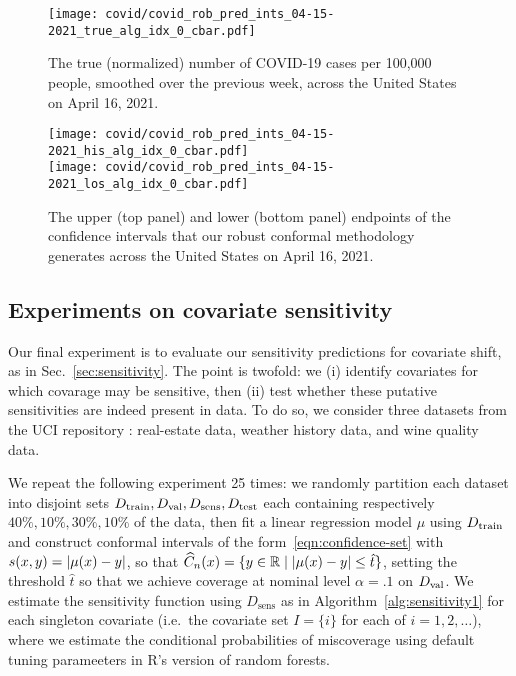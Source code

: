 \begin{figure}[ht!]
  \centering
  \texttt{[image: covid/covid\_rob\_pred\_ints\_04-15-2021\_true\_alg\_idx\_0\_cbar.pdf]}
  \caption{The true (normalized) number of COVID-19 cases per 100{,}000 people, smoothed over the previous week, across the United States on April 16, 2021.}
  \label{fig:covid-true}
\end{figure}

\clearpage
\begin{figure}[h!]
  \centering
  \texttt{[image: covid/covid\_rob\_pred\_ints\_04-15-2021\_his\_alg\_idx\_0\_cbar.pdf]} \\
  \texttt{[image: covid/covid\_rob\_pred\_ints\_04-15-2021\_los\_alg\_idx\_0\_cbar.pdf]}
  \caption{The upper (top panel) and lower (bottom panel) endpoints of the confidence intervals that our robust conformal methodology generates across the United States on April 16, 2021.}
  \label{fig:covid-hi-lo}
\end{figure}
\clearpage

\subsection{Experiments on covariate sensitivity}
\label{sec:covariate-sensitivity}

Our final experiment is to evaluate our sensitivity predictions for
covariate shift, as in Sec.~\ref{sec:sensitivity}. The point is twofold: we
(i) identify covariates for which covarage may be sensitive, then (ii) test
whether these putative sensitivities are indeed present in data. To do so,
we consider three datasets from the UCI repository \citep{DuaGr17}:
real-estate data, weather history data, and wine quality data.

We repeat the following experiment 25 times:
we randomly partition each
dataset into disjoint sets $D_{\textrm{train}}, D_{\textrm{val}}, D_{\text{sens}}, D_{\textrm{test}}$ each
containing respectively $40\%, 10\%,30\%,10\%$ of the data, then fit a
linear regression model $\mu$ using $D_{\textrm{train}}$ and construct conformal
intervals of the form~\eqref{eqn:confidence-set} with $s(x, y) =
|\mu(x)- y|$, so that $\widehat{C}_n(x) = \{y \in \mathbb{R} \mid |\mu(x) - y| \le
\hat{t}\}$, setting the threshold $\hat{t}$ so that we achieve coverage at
nominal level $\alpha = .1$ on $D_{\textrm{val}}$.  We estimate the sensitivity
function using $D_{\text{sens}}$ as in Algorithm~\ref{alg:sensitivity1}
for each singleton covariate (i.e.\ the covariate set $I = \{i\}$ for
each of $i = 1, 2, \ldots$),
where we estimate the conditional probabilities of miscoverage using default
tuning parameeters in R's version of random forests.

